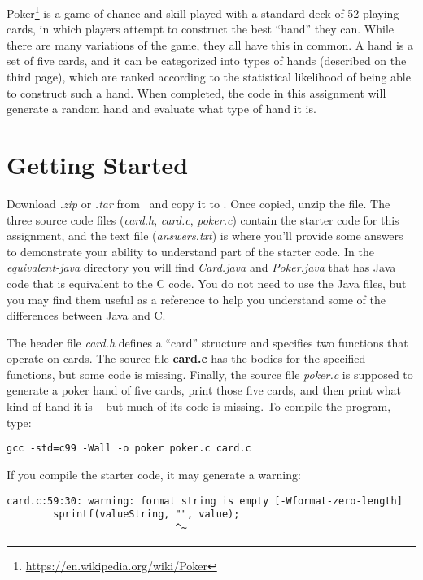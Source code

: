 Poker\footnote{\url{https://en.wikipedia.org/wiki/Poker}} is a game of chance
and skill played with a standard deck of 52 playing cards, in which players
attempt to construct the best ``hand'' they can. While there are many
variations of the game, they all have this in common. A hand is a set of five
cards, and it can be categorized into types of hands (described on the third
page), which are ranked according to the statistical likelihood of being able
to construct such a hand. When completed, the code in this assignment will
generate a random hand and evaluate what type of hand it is.

\section{Getting Started}

Download \textit{\shortlabname.zip} or \textit{\shortlabname.tar} from
\filesource\ and copy it to \runtimeenvironment. Once copied, unzip the file.
The three source code files (\textit{card.h}, \textit{card.c},
\textit{poker.c}) contain the starter code for this assignment, and the text
file (\textit{answers.txt}) is where you'll provide some answers to demonstrate
your ability to understand part of the starter code. In the
\mbox{\textit{equivalent-java}} directory you will find \textit{Card.java} and
\textit{Poker.java} that has Java code that is equivalent to the C code. You do
not need to use the Java files, but you may find them useful as a reference to
help you understand some of the differences between Java and C.

The header file \textit{card.h} defines a ``card'' structure and specifies two
functions that operate on cards. The source file \textbf{card.c} has the bodies
for the specified functions, but some code is missing. Finally, the source file
\textit{poker.c} is supposed to generate a poker hand of five cards, print
those five cards, and then print what kind of hand it is -- but much of its
code is missing. To compile the program, type:

\texttt{gcc -std=c99 -Wall -o poker poker.c card.c}

If you compile the starter code, it may generate a warning:

\begin{verbatim}
card.c:59:30: warning: format string is empty [-Wformat-zero-length]
        sprintf(valueString, "", value);
                             ^~
\end{verbatim}

